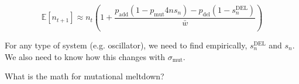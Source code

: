 \documentclass{article}
\begin{document}
\begin{equation}
\mathbb{E} \left[ n_{t+1} \right] \approx n_t \left( 1 + \frac{p_{\text{add}} \left(1 - p_{\text{mut}}4ns_n\right) - p_{\text{del}} \left(1 - s^{\text{DEL}}_{n}\right)}{\bar{w}} \right)
\end{equation}

For any type of system (e.g. oscillator), we need to find empirically, $s^{\text{DEL}}_n$ and $s_n$. We also need to know how this changes with $\sigma_{\text{mut}}$. 

What is the math for mutational meltdown? 
\end{document}
